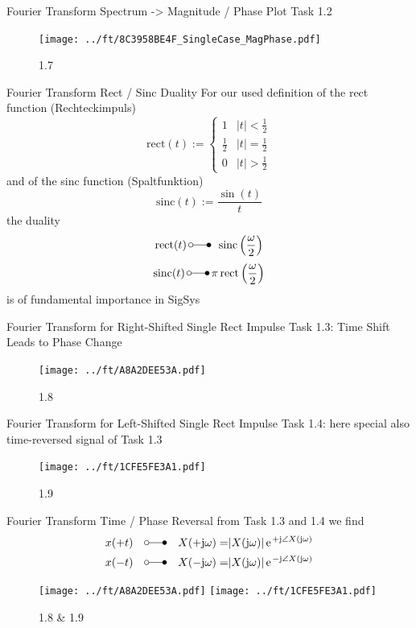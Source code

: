\documentclass[mathserif, aspectratio=43]{intbeamer}
\begin{document}
\begin{frame}{Fourier Transform Spectrum -> Magnitude / Phase Plot}
Task 1.2
\begin{figure}
\texttt{[image: ../ft/8C3958BE4F\_SingleCase\_MagPhase.pdf]}
\caption{1.7}
\end{figure}
\end{frame}


\begin{frame}{Fourier Transform Rect / Sinc Duality}
For our used definition of the rect function (Rechteckimpuls)
$$\text{rect}(t) := \begin{cases} 1 & |t| < \frac{1}{2} \\ \frac{1}{2} & |t| = \frac{1}{2} \\ 0 & |t| > \frac{1}{2} \end{cases}$$
and of the sinc function (Spaltfunktion)
$$\text{sinc}(t) := \frac{\sin(t)}{t}$$
the duality
$$\text{rect}(t) \,\laplace\,  \,\,\,\text{sinc}\left( \frac{\omega}{2} \right)$$
$$\text{sinc}(t) \,\laplace\, \pi \,\text{rect}\left(\frac{\omega}{2}\right)$$
is of fundamental importance in SigSys
\end{frame}



\begin{frame}{Fourier Transform for Right-Shifted Single Rect Impulse}
Task 1.3: Time Shift Leads to Phase Change
\begin{figure}
\texttt{[image: ../ft/A8A2DEE53A.pdf]}
\caption{1.8}
\end{figure}
\end{frame}



\begin{frame}{Fourier Transform for Left-Shifted Single Rect Impulse}
Task 1.4: here special also time-reversed signal of Task 1.3
\begin{figure}
\texttt{[image: ../ft/1CFE5FE3A1.pdf]}
\caption{1.9}
\end{figure}
\end{frame}



\begin{frame}{Fourier Transform Time / Phase Reversal}
%
from Task 1.3 and 1.4 we find
\begin{align*}
x(+t) \quad \laplace \quad X(+\im\omega) =& |X(\im\omega)| \, \e^{+\im\angle X(\im\omega)}\\
x(-t) \quad \laplace \quad X(-\im\omega) =& |X(\im\omega)| \, \e^{-\im\angle X(\im\omega)}
\end{align*}
%
\begin{figure}
\texttt{[image: ../ft/A8A2DEE53A.pdf]}
\texttt{[image: ../ft/1CFE5FE3A1.pdf]}
\caption{1.8 \& 1.9}
\end{figure}
%
\end{frame}
\end{document}
